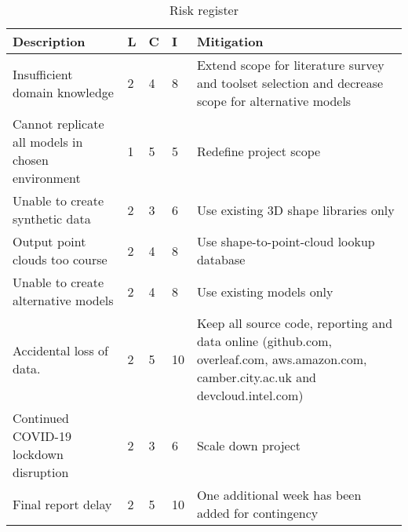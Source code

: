 

\begin{table}[h]
\begin{center}
\begin{tabular}{ |m{55mm}|m{3mm}|m{3mm}|m{5mm}|m{73mm}| } 
\hline
\textbf{Description} & \textbf{L} & \textbf{C} & \textbf{I} & \textbf{Mitigation} \\ \hline

Insufficient domain knowledge
& 2 & 4 & \cellcolor[HTML]{FFBF00} 8 &
Extend scope for literature survey and toolset selection and decrease scope for alternative models \\ \hline

Cannot replicate all models in chosen environment 
& 1 & 5 & \cellcolor[HTML]{00FF00} 5 &
Redefine project scope \\ \hline

Unable to create synthetic data
& 2 & 3 & \cellcolor[HTML]{FFBF00} 6 &
Use existing 3D shape libraries only\\ \hline

Output point clouds too course
& 2 & 4 & \cellcolor[HTML]{FFBF00} 8 &
Use shape-to-point-cloud lookup database\\ \hline

Unable to create alternative models
& 2 & 4 & \cellcolor[HTML]{FFBF00} 8 &
Use existing models only \\ \hline

Accidental loss of data.
& 2 & 5 & \cellcolor[HTML]{FF0000} 10 &
Keep all source code, reporting and data online (github.com, overleaf.com, aws.amazon.com, camber.city.ac.uk and devcloud.intel.com) \\ \hline

Continued COVID-19 lockdown disruption
& 2 & 3 & \cellcolor[HTML]{FFBF00} 6 &
Scale down project \\ \hline

Final report delay 
& 2 & 5 & \cellcolor[HTML]{FF0000} 10 & 
One additional week has been added for contingency \\ \hline
\end{tabular}
\end{center}
\caption{Risk register}
\label{table:risk_table}
\end{table}